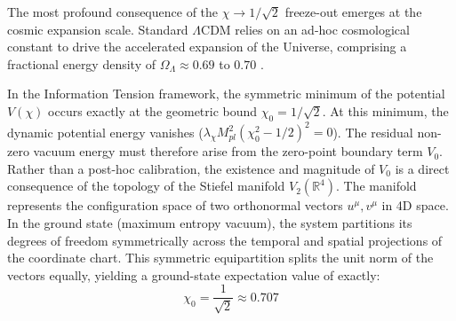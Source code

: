 \documentclass[twocolumn,amsmath,amssymb,floatfix]{article}
\begin{document}
The most profound consequence of the $\chi \to 1/\sqrt{2}$ freeze-out emerges at the cosmic expansion scale. Standard $\Lambda$CDM relies on an ad-hoc cosmological constant to drive the accelerated expansion of the Universe, comprising a fractional energy density of $\Omega_\Lambda \approx 0.69$ to $0.70$ \citep{Planck2020}.

In the Information Tension framework, the symmetric minimum of the potential $V(\chi)$ occurs exactly at the geometric bound $\chi_0 = 1/\sqrt{2}$. At this minimum, the dynamic potential energy vanishes ($\lambda_\chi M_{pl}^2 (\chi_0^2 - 1/2)^2 = 0$). The residual non-zero vacuum energy must therefore arise from the zero-point boundary term $V_0$. Rather than a post-hoc calibration, the existence and magnitude of $V_0$ is a direct consequence of the topology of the Stiefel manifold $V_2(\mathbb{R}^4)$. The manifold represents the configuration space of two orthonormal vectors $u^\mu, v^\mu$ in 4D space. In the ground state (maximum entropy vacuum), the system partitions its degrees of freedom symmetrically across the temporal and spatial projections of the coordinate chart. This symmetric equipartition splits the unit norm of the vectors equally, yielding a ground-state expectation value of exactly:
\begin{equation}
    \chi_0 = \frac{1}{\sqrt{2}} \approx 0.707
\end{equation}
\end{document}
